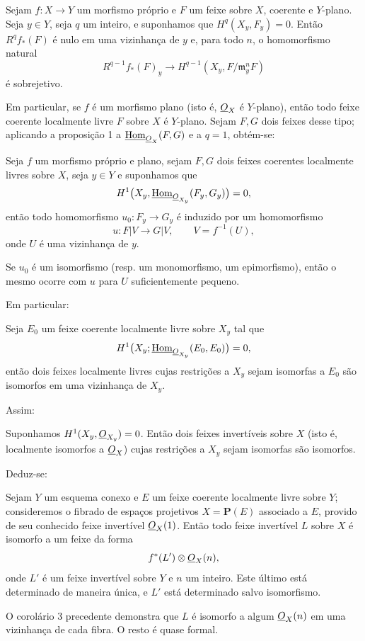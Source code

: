  Sejam $f:X\longrightarrow Y$ um morfismo próprio e $F$
um feixe sobre $X$, coerente e $Y$-plano. Seja $y\in Y$, seja $q$ um inteiro, e
suponhamos que $H^q(X_y,F_y)=0$. Então $R^qf_*(F)$ é nulo em uma vizinhança de
$y$ e, para todo $n$, o homomorfismo natural
\[
  R^{q-1}f_*(F)_y\longrightarrow
  H^{q-1}(X_y,F/\mathfrak m_y^nF)
\]
é sobrejetivo.

Em particular, se $f$ é um morfismo plano (isto é, $\underline{O}_X$ é $Y$-plano),
então todo feixe coerente localmente livre $F$ sobre $X$ é $Y$-plano. Sejam
$F,G$ dois feixes desse tipo; aplicando a proposição 1 a
$\underline{\operatorname{Hom}}_{\underline{O}_X}(F,G)$ e a $q=1$, obtém-se:

 Seja $f$ um morfismo próprio e plano, sejam $F,G$ dois feixes
coerentes localmente livres sobre $X$, seja $y\in Y$ e suponhamos que
\[
  H^1\bigl(X_y,\underline{\operatorname{Hom}}_{\underline{O}_{X_y}}(F_y,G_y)\bigr)=0,
\]
então todo homomorfismo $u_0:F_y\longrightarrow G_y$ é induzido por um
homomorfismo
\[
  u:F|V\longrightarrow G|V,
  \qquad V=f^{-1}(U),
\]
onde $U$ é uma vizinhança de $y$.

 Se $u_0$ é um isomorfismo (resp. um monomorfismo, um
epimorfismo), então o mesmo ocorre com $u$ para $U$ suficientemente
pequeno.

Em particular:

 Seja $E_0$ um feixe coerente localmente livre sobre $X_y$
tal que
\[
  H^1\bigl(X_y;\underline{\operatorname{Hom}}_{\underline{O}_{X_y}}(E_0,E_0)\bigr)=0,
\]
então dois feixes localmente livres cujas restrições a $X_y$ sejam isomorfas
a $E_0$ são isomorfos em uma vizinhança de $X_y$.

Assim:

 Suponhamos $H^1(X_y,\underline{O}_{X_y})=0$. Então dois feixes
invertíveis sobre $X$ (isto é, localmente isomorfos a $\underline{O}_X$) cujas
restrições a $X_y$ sejam isomorfas são isomorfos.

Deduz-se:

 Sejam $Y$ um esquema conexo e $E$ um feixe coerente localmente livre sobre $Y$; consideremos o fibrado de espaços projetivos
$X=\mathbf P(E)$ associado a $E$, provido de seu conhecido feixe invertível
$\underline{O}_X(1)$. Então todo feixe invertível $L$ sobre $X$ é isomorfo a um feixe da
forma
\[
  f^*(L')\otimes\underline{O}_X(n),
\]
onde $L'$ é um feixe invertível sobre $Y$ e $n$ um inteiro. Este último está
determinado de maneira única, e $L'$ está determinado salvo isomorfismo.

O corolário 3 precedente demonstra que $L$ é isomorfo a algum $\underline{O}_X(n)$ em
uma vizinhança de cada fibra. O resto é quase formal.

